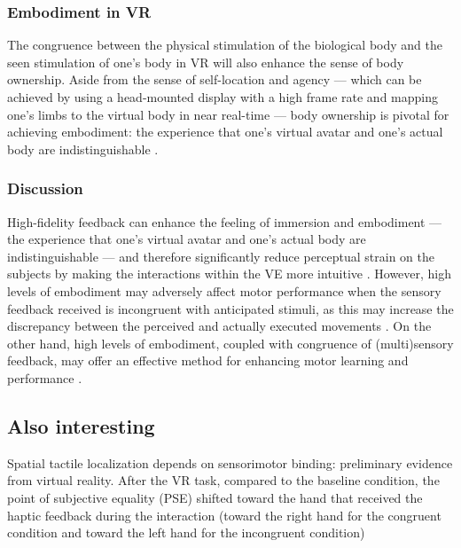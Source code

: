 \subsubsection{Embodiment in VR}
The congruence between the physical stimulation of the biological body and the seen stimulation of one's body in VR will also enhance the sense of body ownership. Aside from the sense of self-location and agency --- which can be achieved by using a head-mounted display with a high frame rate and mapping one's limbs to the virtual body in near real-time --- body ownership is pivotal for achieving embodiment:  the experience that one's virtual avatar and one's actual body are indistinguishable \cite{Kilteni2012TheReality}.

\subsubsection{Discussion}
High-fidelity feedback can enhance the feeling of immersion and embodiment --- the experience that one's virtual avatar and one's actual body are indistinguishable \cite{Kilteni2012TheReality} --- and therefore significantly reduce perceptual strain on the subjects by making the interactions within the VE more intuitive \cite{Yang2023TheSimulation}. However, high levels of embodiment may adversely affect motor performance when the sensory feedback received is incongruent with anticipated stimuli, as this may increase the discrepancy between the perceived and actually executed movements \cite{Odermatt2021CongruencyReality}.
On the other hand, high levels of embodiment, coupled with congruence of (multi)sensory feedback, may offer an effective method for enhancing motor learning and performance \cite{Odermatt2021CongruencyReality}. 

\subsection{Also interesting}
Spatial tactile localization depends on sensorimotor binding: preliminary evidence from virtual reality. After the VR task, compared to the baseline condition, the point of subjective equality (PSE) shifted toward the hand that received the haptic feedback during the interaction (toward the right hand for the congruent condition and toward the left hand for the incongruent condition)\cite{Girondini2024SpatialReality}


